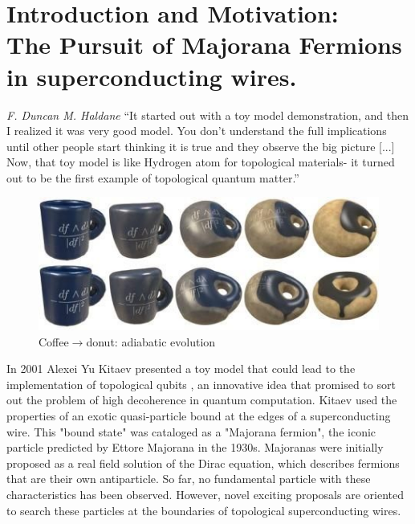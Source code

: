 \chapter{Introduction and Motivation: \\ The Pursuit of Majorana Fermions in superconducting wires. \label{chap:Motivation} }


\begin{chapquote}{\textit{F. Duncan M. Haldane}}
``It started out with a toy model demonstration, and then I realized it was very good model.  You don't understand the full implications until other people start thinking it is true and they observe the big picture [...] Now, that toy model is like Hydrogen atom for topological materials- it turned out to be the first example of topological quantum matter.''
\end{chapquote}
\begin{figure}[b]
  \centering
  \includegraphics[scale = 0.5]{IMAGES/Majorana/Coffe&donuts.jpg}
  \caption{Coffee$\rightarrow$donut: adiabatic evolution \label{fig:Coffe}}
\end{figure}


In 2001 Alexei Yu Kitaev presented a toy model that could lead to the implementation of topological qubits \citep{kitaev_unpaired_2001}, an innovative idea that promised to sort out the problem of high decoherence in quantum computation. Kitaev used the properties of an exotic quasi-particle bound at the edges of a superconducting wire. This "bound state" was cataloged as a "Majorana fermion", the iconic particle predicted by Ettore Majorana in the 1930s. Majoranas were initially proposed as a real field solution of the Dirac equation, which describes fermions that are their own antiparticle\citep{wilczek_majorana_2009}.  So far, no fundamental particle with these characteristics has been observed. However, novel exciting  proposals are oriented to search these particles at the boundaries of topological superconducting wires. 




